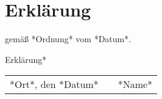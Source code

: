 \chapter*{Erklärung}
\thispagestyle{empty}
gemäß *Ordnung* vom *Datum*.

\vspace{0.5cm}
\noindent *Erklärung*
\vspace{1.5cm}
\begin{table}[h!]
	\centering
		\begin{tabularx}{\textwidth}{lXr}
		\hline
		*Ort*, den *Datum* & & *Name* \\
		\end{tabularx}
\end{table}